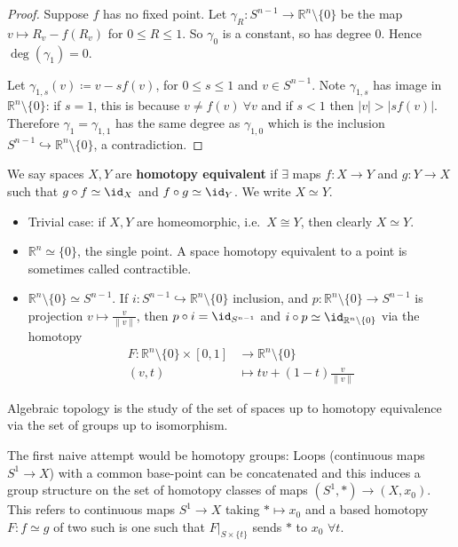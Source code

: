 \documentclass{article}
\begin{document}
\begin{proof}
  Suppose $f$ has no fixed point.
  Let $\gamma_R: S^{n-1} \to \mathbb{R}^n \setminus \{0\}$ be the map $v \mapsto R_v - f(R_v)$ for $0 \leq R \leq 1$. So $\gamma_0$ is a constant, so has degree 0.
  Hence $\deg(\gamma_1) = 0$.

  Let $\gamma_{1,s}(v) \coloneqq v - s f(v)$, for $0 \leq s \leq 1$ and $v \in S^{n-1}$.
  Note $\gamma_{1,s}$ has image in $\mathbb{R}^n \setminus \{0\}$: if $s=1$, this is because $v \neq f(v) \ \forall v$ and if $s < 1$ then $|v| > |s f(v)|$.
  Therefore $\gamma_1 = \gamma_{1,1}$ has the same degree as $\gamma_{1,0}$ which is the inclusion $S^{n-1} \hookrightarrow \mathbb{R}^n\setminus\{0\}$, a contradiction.
\end{proof}
\begin{defi}
  We say spaces $X,Y$ are \textbf{homotopy equivalent} if $\exists$ maps $f : X \to Y$ and $g: Y \to X$ such that $g \circ f \simeq \id_X$ and $f \circ g \simeq \id_Y$. We write $X \simeq Y$.
\end{defi}
\begin{eg}\leavevmode
  \begin{itemize}
    \item Trivial case: if $X,Y$ are homeomorphic, i.e.\ $X \cong Y$, then clearly $X \simeq Y$.

    \item $\mathbb{R}^n \simeq \{0\}$, the single point. A space homotopy equivalent to a point is sometimes called contractible.
    \item $\mathbb{R}^n \setminus \{0\} \simeq S^{n-1}$.
      If $i: S^{n-1} \hookrightarrow \mathbb{R}^n \setminus \{0\}$ inclusion, and $p: \mathbb{R}^n \setminus \{0\} \to S^{n-1}$ is projection $v \mapsto \frac{v}{\|v\|}$, then $p \circ i = \id_{S^{n-1}}$ and $i \circ p \simeq \id_{\mathbb{R}^n \setminus \{0\}}$ via the homotopy
      \begin{align*}
        F: \mathbb{R}^n \setminus \{0\} \times [0,1] &\longrightarrow \mathbb{R}^n \setminus \{0\} \\
        (v,t) &\longmapsto t v + (1-t) \frac{v}{\|v\|}
      \end{align*}
  \end{itemize}
\end{eg}
Algebraic topology is the study of the set of spaces up to homotopy equivalence via the set of groups up to isomorphism.

The first naive attempt would be homotopy groups:
Loops (continuous maps $S^1 \to X$) with a common base-point can be concatenated and this induces a group structure on the set of homotopy classes of maps $(S^1, *) \to (X, x_0)$.
This refers to continuous maps $S^1 \to X$ taking $* \mapsto x_0$ and a based homotopy $F : f \simeq g$ of two such is one such that $F |_{S \times \{t\}}$ sends $*$ to $x_0$ $\forall t$.
\end{document}
